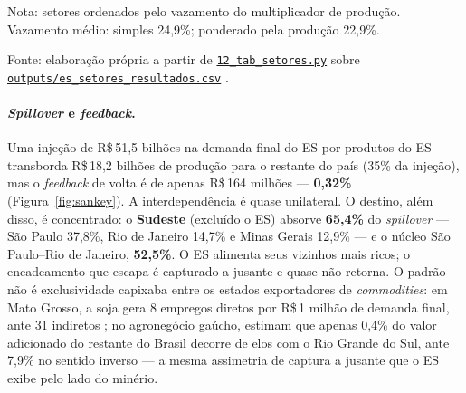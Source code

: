 \documentclass[11pt,a4paper]{article}
\begin{document}
\begin{table}[tbp]
\caption{Multiplicador de produção, vazamentos de produção e de emprego e ligações de
Rasmussen--Hirschman dos 26 setores do ES (2008)}
\label{tab:setores}
\centering\small
\begin{threeparttable}

\begin{tablenotes}[flushleft]\footnotesize
\item Nota: setores ordenados pelo vazamento do multiplicador de produção. Vazamento médio:
simples 24,9\%; ponderado pela produção 22,9\%.
\item Fonte: elaboração própria a partir de
\href{https://github.com/fcarva/es-insumo-produto/blob/116a350/pesquisa/12_tab_setores.py}{\texttt{12\_tab\_setores.py}}
sobre
\href{https://github.com/fcarva/es-insumo-produto/blob/116a350/pesquisa/outputs/es_setores_resultados.csv}{\texttt{outputs/es\_setores\_resultados.csv}}
\citep{carvalho2026repo}.
\end{tablenotes}
\end{threeparttable}
\end{table}

\paragraph{\emph{Spillover} e \emph{feedback}.} Uma injeção de R\$\,51,5 bilhões na demanda
final do ES por produtos do ES transborda R\$\,18,2 bilhões de produção para o restante do país
(35\% da injeção), mas o \emph{feedback} de volta é de apenas R\$\,164 milhões ---
\textbf{0,32\%} (Figura~\ref{fig:sankey}). A interdependência é quase unilateral. O destino,
além disso, é concentrado: o \textbf{Sudeste} (excluído o ES) absorve \textbf{65,4\%} do
\emph{spillover} --- São Paulo 37,8\%, Rio de Janeiro 14,7\% e Minas Gerais 12,9\% --- e o
núcleo São Paulo--Rio de Janeiro, \textbf{52,5\%}. O ES alimenta seus vizinhos mais ricos; o
encadeamento que escapa é capturado a jusante e quase não retorna. O padrão não é
exclusividade capixaba entre os estados exportadores de \emph{commodities}: em Mato Grosso, a
soja gera 8 empregos diretos por R\$\,1 milhão de demanda final, ante 31 indiretos
\citep{figueiredo2004agriculture}; no agronegócio gaúcho, \citet{peixoto2013metodologia}
estimam que apenas 0,4\% do valor adicionado do restante do Brasil decorre de elos com o Rio
Grande do Sul, ante 7,9\% no sentido inverso --- a mesma assimetria de captura a jusante que o
ES exibe pelo lado do minério.
\end{document}

